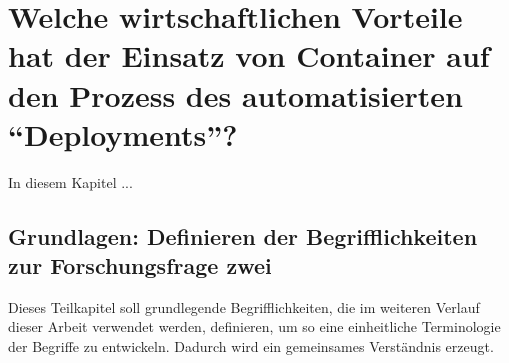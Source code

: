 \chapter[Forschungsfrage 2]{Welche wirtschaftlichen Vorteile hat der Einsatz von Container auf den Prozess des automatisierten \enquote{Deployments}?} \label{ff2}
In diesem Kapitel ...

\section{Grundlagen: Definieren der Begrifflichkeiten zur Forschungsfrage zwei}
Dieses Teilkapitel soll grundlegende Begrifflichkeiten, die im weiteren Verlauf dieser Arbeit verwendet werden, definieren, um so eine einheitliche Terminologie der Begriffe zu entwickeln. Dadurch wird ein gemeinsames Verständnis erzeugt.

